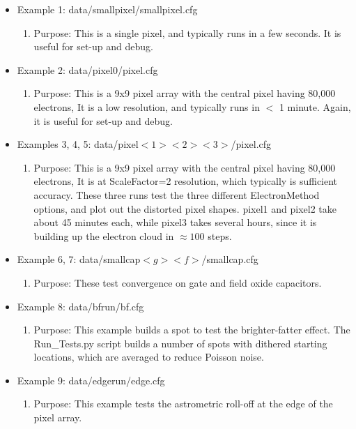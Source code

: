 \documentclass{article} %
\begin{document}
\begin{itemize}
  \item Example 1: data/smallpixel/smallpixel.cfg
    \begin{enumerate}
      \item Purpose: This is a single pixel, and typically runs in a few seconds.  It is useful for set-up and debug.
    \end{enumerate}

  \item Example 2: data/pixel0/pixel.cfg
    \begin{enumerate}
      \item Purpose: This is a 9x9 pixel array with the central pixel having 80,000 electrons,  It is a low resolution, and typically runs in $<$ 1 minute. Again, it is useful for set-up and debug.  
    \end{enumerate}

  \item Examples 3, 4, 5: data/pixel$<1><2><3>$/pixel.cfg
    \begin{enumerate}
      \item Purpose: This is a 9x9 pixel array with the central pixel having 80,000 electrons,  It is at ScaleFactor=2 resolution, which typically is sufficient accuracy. These three runs test the three different ElectronMethod options, and plot out the distorted pixel shapes.  pixel1 and pixel2 take about 45 minutes each, while pixel3 takes several hours, since it is building up the electron cloud in $\approx 100$ steps.
    \end{enumerate}

  \item Example 6, 7: data/smallcap$<g><f>$/smallcap.cfg
    \begin{enumerate}
      \item Purpose: These test convergence on gate and field oxide capacitors.
    \end{enumerate}

  \item Example 8: data/bfrun/bf.cfg
    \begin{enumerate}
      \item Purpose: This example builds a spot to test the brighter-fatter effect.  The Run\_Tests.py script builds a number of spots with dithered starting locations, which are averaged to reduce Poisson noise.
    \end{enumerate}

  \item Example 9: data/edgerun/edge.cfg
    \begin{enumerate}
      \item Purpose: This example tests the astrometric roll-off at the edge of the pixel array.
    \end{enumerate}


\end{itemize}
\end{document}
